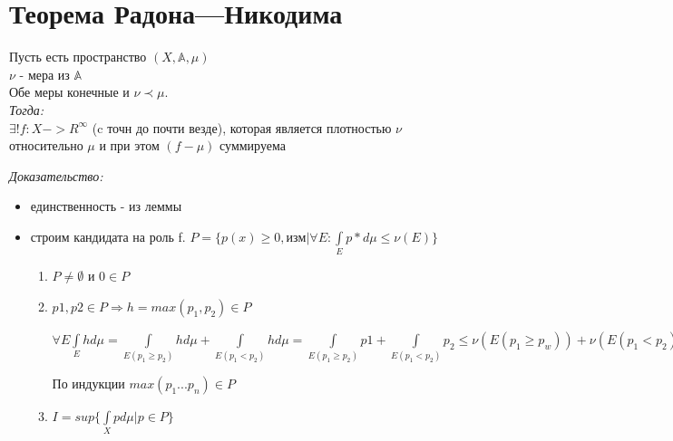 \documentclass[paper=a4, fontsize=17pt]{article}
\begin{document}
\section{Теорема Радона---Никодима}
	Пусть есть пространство $(X, \mathbb{A}, \mu)$ \\ 
	$\nu$ - мера из $\mathbb{A}$ \\
	Обе меры конечные и $\nu \prec \mu$. \\
	\emph{Тогда: } \\
		$\exists! f: X->R^{\infty}$ (c точн до почти везде), которая является плотностью $\nu$ относительно $\mu$ и при этом $(f - \mu)$ суммируема
		
	\emph{Доказательство: } 
		\begin{itemize}
			\item единственность - из леммы
			\item строим кандидата на роль f. $P = \{p(x) \geq 0, изм| \forall E :  \int\limits_E p*d\mu \leq \nu(E)\}$
			\begin{enumerate}
				\item 
				$P \neq \emptyset$ и $0 \in P$
				\item 
				$p1, p2 \in P \Rightarrow h = max(p_1, p_2) \in P$
				
				$\forall E \int\limits_E h d\mu = \int\limits_{E(p_1 \geq p_2)} h d\mu + \int\limits_{E(p_1 < p_2)} h d\mu = 
				\int\limits_{E(p_1 \geq p_2)} p1 + \int\limits_{E(p_1 < p_2)} p_2 \leq \nu(E(p_1 \geq p_w)) + \nu(E(p_1 < p_2)) = \nu E$
				
				По индукции $max(p_1...p_n)\in P$
				\item 
				$I = sup\{\int\limits_X p d\mu | p \in P\}$
				

\end{enumerate}
\end{itemize}
\end{document}
